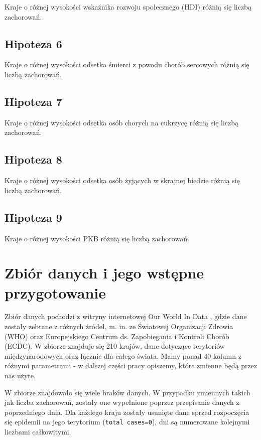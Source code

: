 \documentclass[12pt]{mwbk}
\theoremstyle{plain}
\theoremstyle{definition}
\theoremstyle{remark}
\begin{document}
Kraje o różnej wysokości wskaźnika rozwoju społecznego (HDI) różnią się liczbą zachorowań.

\subsection{Hipoteza 6}

Kraje o różnej wysokości odsetka śmierci z powodu chorób sercowych różnią się liczbą zachorowań.

\subsection{Hipoteza 7}

Kraje o różnej wysokości odsetka osób chorych na cukrzycę różnią się liczbą zachorowań.

\subsection{Hipoteza 8}

Kraje o różnej wysokości odsetka osób żyjących w skrajnej biedzie różnią się liczbą zachorowań.

\subsection{Hipoteza 9}

Kraje o różnej wysokości PKB różnią się liczbą zachorowań.

\section{Zbiór danych i jego wstępne przygotowanie}

Zbiór danych pochodzi z witryny internetowej Our World In Data \cite{owid}, gdzie dane zostały zebrane z różnych źródeł, m. in. ze Światowej Organizacji Zdrowia (WHO) oraz Europejskiego Centrum ds. Zapobiegania i Kontroli Chorób (ECDC). W zbiorze znajduje się 210 krajów, dane dotyczące terytoriów międzynarodowych oraz łącznie dla całego świata. Mamy ponad 40 kolumn z różnymi parametrami - w dalszej części pracy opiszemy, które zmienne będą przez nas użyte.

W zbiorze znajdowało się wiele braków danych. W przypadku zmiennych takich jak liczba zachorowań, zostały one wypełnione poprzez przepisanie danych z poprzedniego dnia. Dla każdego kraju zostały usunięte dane sprzed rozpoczęcia się epidemii na jego terytorium (\texttt{total cases=0}), dni są numerowane kolejnymi liczbami całkowitymi.
\end{document}
